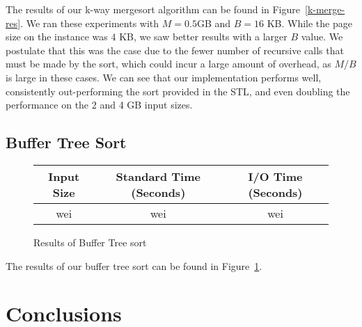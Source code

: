 \documentclass{article}
\begin{document}
The results of our k-way mergesort algorithm can be found in Figure~\ref{k-merge-res}.
%
We ran these experiments with $M = 0.5$GB and $B = 16$ KB.
%
While the page size on the instance was $4$ KB, we saw better results with a larger $B$
value.
%
We postulate that this was the case due to the fewer number of recursive calls that must be
made by the sort, which could incur a large amount of overhead, as $M/B$ is large in these cases.
%
We can see that our implementation performs well, consistently out-performing the sort
provided in the STL, and even doubling the performance on the 2 and 4 GB input sizes.

\subsection{Buffer Tree Sort}

\begin{figure}
  \centering
  \begin{tabular}{|c|c|c|}
    \hline
    Input Size & Standard Time (Seconds) & I/O Time (Seconds)\\
    \hline
    \hline
    wei & wei & wei \\
    \hline
  \end{tabular}
  \caption{Results of Buffer Tree sort}
  \label{buffer-tree-res}
\end{figure}

The results of our buffer tree sort can be found in Figure~\ref{buffer-tree-res}.



\section{Conclusions}
\end{document}
